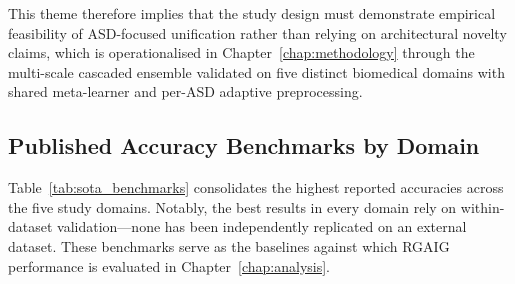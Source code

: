 \noindent This theme therefore implies that the study design must demonstrate empirical feasibility of ASD-focused unification rather than relying on architectural novelty claims, which is operationalised in Chapter~\ref{chap:methodology} through the multi-scale cascaded ensemble validated on five distinct biomedical domains with shared meta-learner and per-ASD adaptive preprocessing.

\subsection{Published Accuracy Benchmarks by Domain}

\iffalse %
Table~\ref{tab:sota_benchmarks} consolidates the highest reported accuracies across the five study domains. Notably, the best results in every domain rely on within-dataset validation---none has been independently replicated on an external dataset. These benchmarks serve as the baselines against which RGAIG performance is evaluated in Chapter~\ref{chap:analysis}.

